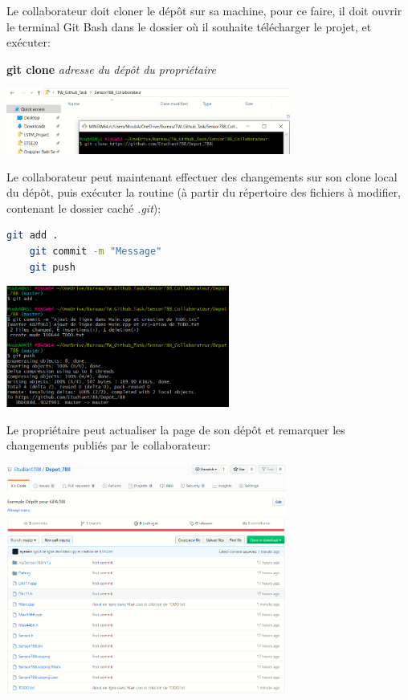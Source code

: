 \documentclass{article}
\begin{document}
\begin{flushleft}
Le collaborateur doit cloner le dépôt sur sa machine, pour ce faire, il doit ouvrir le terminal Git Bash dans le dossier où il souhaite télécharger le projet, et exécuter:
\end{flushleft}

\begin{center}
    \textbf{git clone} \textit{adresse du dépôt du propriétaire}\\
\end{center}

\includegraphics[width=0.7\textwidth, center]{Git_Clone}

\begin{flushleft}
Le collaborateur peut maintenant effectuer des changements sur son clone local du dépôt, puis exécuter la routine (à partir du répertoire des fichiers à modifier, contenant le dossier caché \textit{.git}):
\end{flushleft}
\begin{lstlisting}[language=bash]
    git add .
    git commit -m "Message"
    git push
\end{lstlisting}

\includegraphics[width=0.55\textwidth, center]{Collab_Push}

\pagebreak
\begin{flushleft}
Le propriétaire peut actualiser la page de son dépôt et remarquer les changements publiés par le collaborateur:
\end{flushleft}
\includegraphics[width=0.69\textwidth, center]{Proprio_Perspective}
\end{document}

